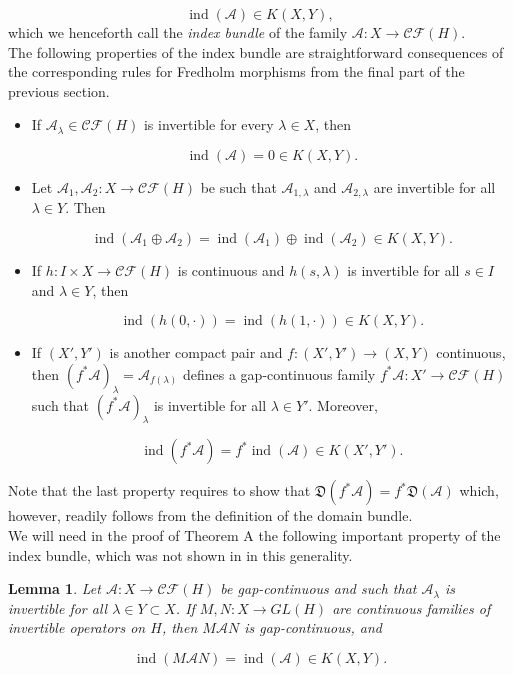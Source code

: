 \documentclass[a4paper,10pt]{article}
\newtheorem{lemma}[theorem]{Lemma}
\DeclareMathOperator{\ind}{ind}
\begin{document}
\[\ind(\mathcal{A})\in K(X,Y),\]  
which we henceforth call the \textit{index bundle} of the family $\mathcal{A}:X\rightarrow\mathcal{CF}(H)$.\\
The following properties of the index bundle are straightforward consequences of the corresponding rules for Fredholm morphisms from the final part of the previous section.

\begin{itemize}
\item If $\mathcal{A}_\lambda\in\mathcal{CF}(H)$ is invertible for every $\lambda\in X$, then

\[\ind(\mathcal{A})=0\in K(X,Y).\]
\item Let $\mathcal{A}_1,\mathcal{A}_2:X\rightarrow\mathcal{CF}(H)$ be such that $\mathcal{A}_{1,\lambda}$ and $\mathcal{A}_{2,\lambda}$ are invertible for all $\lambda\in Y$. Then

\[\ind(\mathcal{A}_1\oplus\mathcal{A}_2)=\ind(\mathcal{A}_1)\oplus\ind(\mathcal{A}_2)\in K(X,Y).\]
\item If $h:I\times X\rightarrow\mathcal{CF}(H)$ is continuous and $h(s,\lambda)$ is invertible for all $s\in I$ and $\lambda\in Y$, then

\[\ind(h(0,\cdot))=\ind(h(1,\cdot))\in K(X,Y).\]
\item If $(X',Y')$ is another compact pair and $f:(X',Y')\rightarrow(X,Y)$ continuous, then $(f^\ast\mathcal{A})_\lambda=\mathcal{A}_{f(\lambda)}$ defines a gap-continuous family $f^\ast\mathcal{A}:X'\rightarrow\mathcal{CF}(H)$ such that $(f^\ast\mathcal{A})_\lambda$ is invertible for all $\lambda\in Y'$. Moreover,

\[\ind(f^\ast\mathcal{A})=f^\ast\ind(\mathcal{A})\in K(X',Y').\]  
\end{itemize}
\noindent
Note that the last property requires to show that $\mathfrak{D}(f^\ast\mathcal{A})=f^\ast\mathfrak{D}(\mathcal{A})$ which, however, readily follows from the definition of the domain bundle.\\
We will need in the proof of Theorem A the following important property of the index bundle, which was not shown in \cite{thesis} in this generality. 


\begin{lemma}\label{gap-product}
Let $\mathcal{A}:X\rightarrow\mathcal{CF}(H)$ be gap-continuous and such that $\mathcal{A}_\lambda$ is invertible for all $\lambda\in Y\subset X$. If $M,N:X\rightarrow GL(H)$ are continuous families of invertible operators on $H$, then $M\mathcal{A}N$ is gap-continuous, and 

\[\ind(M\mathcal{A}N)=\ind(\mathcal{A})\in K(X,Y).\]
\end{lemma}
\end{document}
